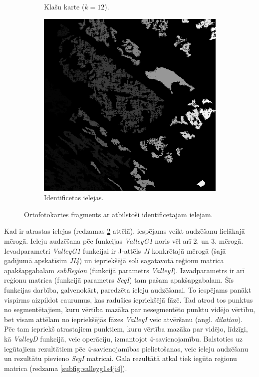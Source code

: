 \documentclass[12pt,paper=a4]{report}
\begin{document}
\begin{figure}[h!]
\begin{subfigure}[b]{.3\linewidth}
\caption{Klašu karte ($k=12$).}
\end{subfigure}
\begin{subfigure}[b]{.3\linewidth}
\includegraphics[width=\linewidth]{regionPecValleyD}
\caption{Identificētās ielejas.}
\label{subfig:valleyd}
\end{subfigure}
\caption{Ortofotokartes fragments ar atbilstoši identificētajām ielejām.}
\end{figure}
Kad ir atrastas ielejas (redzamas \ref{subfig:valleyd} attēlā), iespējams veikt audzēšanu lielākajā mērogā. Ieleju audzēšana pēc funkcijas \textit{ValleyG1} noris vēl arī 2. un 3. mērogā. Ievadparametri \textit{ValleyG1} funkcijai ir J-attēls \textit{JI} konkrētajā mērogā (šajā gadījumā apskatīsim \textit{JI4}) un iepriekšējā solī sagatavotā reģionu matrica apakšapgabalam \textit{subRegion} (funkcijā parametrs \textit{ValleyI}). Izvadparametrs ir arī reģionu matrica (funkcijā parametrs \textit{SegI}) tam pašam apakšapgabalam. Šīs funkcijas darbība, galvenokārt, paredzēta ieleju audzēšanai. To iespējams panākt vispirms aizpildot caurumus, kas radušies iepriekšējā fāzē. Tad atrod tos punktus no segmentētajiem, kuru vērtība mazāka par nesegmentēto punktu vidējo vērtību, bet visam attēlam no iepriekšējās fāzes \textit{ValleyI} veic atvēršanu (angl. \textit{dilation}). Pēc tam iepriekš atrastajiem punktiem, kuru vērtība mazāka par vidējo, līdzīgi, kā \textit{ValleyD} funkcijā, veic operāciju, izmantojot 4-savienojamību. Balstoties uz iegūtajiem rezultātiem pēc 4-savienojamības pielietošanas, veic ieleju audzēšanu un rezultātu pievieno \textit{SegI} matricai. Gala rezultātā atkal tiek iegūta reģionu matrica (redzama \ref{subfig:valleyg1s4ji4}). 
\end{document}
